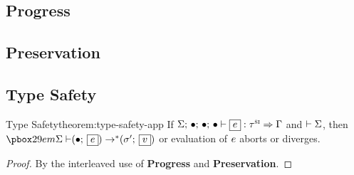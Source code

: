 \newpage
\subsection{Progress}
\label{sec:progress}



\newpage
\subsection{Preservation}
\label{sec:preservation}



\subsection{Type Safety}
\label{sec:type-safety}

\begin{oxtheorem}{Type Safety}{theorem:type-safety-app}
  If $\oxtypjudge{\oxglobalctx}{\oxemptyctx}{\oxemptyctx}{\oxemptyctx}{\oxexpr}
  {\oxsitype}{\oxvarctx}$ and $\vdash \Sigma$, then
  $\oxreducemany{\oxglobalctx}{\oxemptyctx}{\oxexpr}{\oxstore^\prime}{\oxvalue}$ or
  evaluation of $e$ aborts or diverges.
\end{oxtheorem}

\begin{proof}
  By the interleaved use of \textbf{Progress} and \textbf{Preservation}.
\end{proof}

